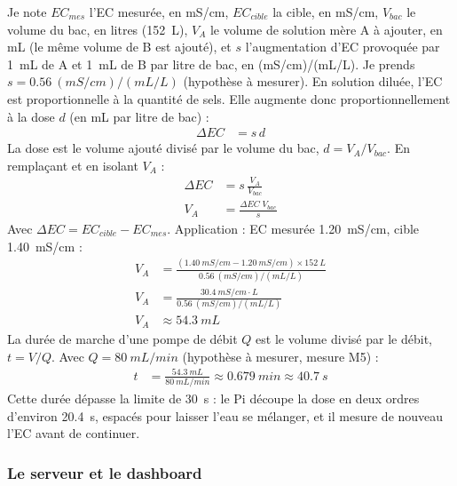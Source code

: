 \begin{demonstration}
Je note $EC_{mes}$ l'EC mesurée, en mS/cm, $EC_{cible}$ la cible, en mS/cm, $V_{bac}$ le volume du bac, en litres (\qty{152}{L}), $V_A$ le volume de solution mère A à ajouter, en mL (le même volume de B est ajouté), et $s$ l'augmentation d'EC provoquée par \qty{1}{mL} de A et \qty{1}{mL} de B par litre de bac, en (mS/cm)/(mL/L). Je prends $s = \qty{0,56}{(mS/cm)/(mL/L)}$ (hypothèse à mesurer). En solution diluée, l'EC est proportionnelle à la quantité de sels. Elle augmente donc proportionnellement à la dose $d$ (en mL par litre de bac) :
\begin{align*}
\Delta EC &= s\,d
\end{align*}
La dose est le volume ajouté divisé par le volume du bac, $d = V_A/V_{bac}$. En remplaçant et en isolant $V_A$ :
\begin{align*}
\Delta EC &= s\,\frac{V_A}{V_{bac}}\\
V_A &= \frac{\Delta EC\; V_{bac}}{s}
\end{align*}
Avec $\Delta EC = EC_{cible} - EC_{mes}$. Application : EC mesurée \qty{1,20}{mS/cm}, cible \qty{1,40}{mS/cm} :
\begin{align*}
V_A &= \frac{(\qty{1,40}{mS/cm} - \qty{1,20}{mS/cm}) \times \qty{152}{L}}{\qty{0,56}{(mS/cm)/(mL/L)}}\\
V_A &= \frac{\qty{30,4}{mS/cm\cdot L}}{\qty{0,56}{(mS/cm)/(mL/L)}}\\
V_A &\approx \qty{54,3}{mL}
\end{align*}
La durée de marche d'une pompe de débit $Q$ est le volume divisé par le débit, $t = V/Q$. Avec $Q = \qty{80}{mL/min}$ (hypothèse à mesurer, mesure M5) :
\begin{align*}
t &= \frac{\qty{54,3}{mL}}{\qty{80}{mL/min}} \approx \qty{0,679}{min} \approx \qty{40,7}{s}
\end{align*}
Cette durée dépasse la limite de \qty{30}{s} : le Pi découpe la dose en deux ordres d'environ \qty{20,4}{s}, espacés pour laisser l'eau se mélanger, et il mesure de nouveau l'EC avant de continuer.
\end{demonstration}

\subsubsection*{Le serveur et le dashboard}

